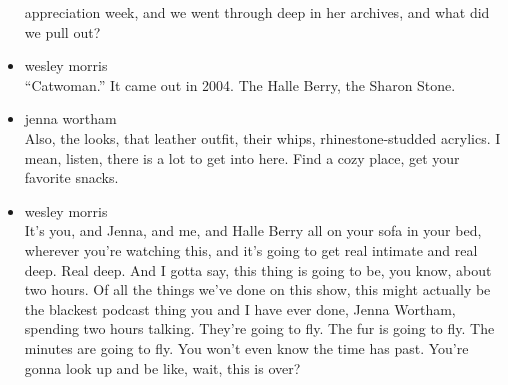 \begin{itemize}
  appreciation week, and we went through deep in her archives, and what
  did we pull out?
\item
  wesley morris\\
  ``Catwoman.'' It came out in 2004. The Halle Berry, the Sharon Stone.
\item
  jenna wortham\\
  Also, the looks, that leather outfit, their whips, rhinestone-studded
  acrylics. I mean, listen, there is a lot to get into here. Find a cozy
  place, get your favorite snacks.
\item
  wesley morris\\
  It's you, and Jenna, and me, and Halle Berry all on your sofa in your
  bed, wherever you're watching this, and it's going to get real
  intimate and real deep. Real deep. And I gotta say, this thing is
  going to be, you know, about two hours. Of all the things we've done
  on this show, this might actually be the blackest podcast thing you
  and I have ever done, Jenna Wortham, spending two hours talking.
  They're going to fly. The fur is going to fly. The minutes are going
  to fly. You won't even know the time has past. You're gonna look up
  and be like, wait, this is over?


\end{itemize}
